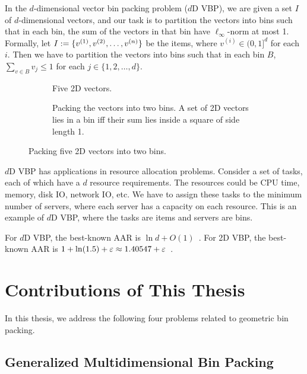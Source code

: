 In the $d$-dimensional vector bin packing problem ($d$D VBP),
we are given a set $I$ of $d$-dimensional vectors,
and our task is to partition the vectors into bins such that in each bin,
the sum of the vectors in that bin have $\ell_\infty$-norm at most 1.
Formally, let $I := \{v^{(1)}, v^{(2)}, \ldots, v^{(n)}\}$ be the items,
where $v^{(i)} \in (0, 1]^d$ for each $i$.
Then we have to partition the vectors into bins such that in each bin $B$,
$\sum_{v \in B} v_j \le 1$ for each $j \in \{1, 2, \ldots, d\}$.

\begin{figure}[htb]
\centering
\begin{subfigure}{0.45\textwidth}
    \centering
    
    \caption{Five 2D vectors.}
\end{subfigure}
\begin{subfigure}{0.54\textwidth}
    \centering
    
    \caption{Packing the vectors into two bins.
    A set of 2D vectors lies in a bin iff their sum
    lies inside a square of side length 1.}
\end{subfigure}
\caption{Packing five 2D vectors into two bins.}
\label{fig:2vbp-example}
\end{figure}

$d$D VBP has applications in resource allocation problems.
Consider a set of tasks, each of which have a $d$ resource requirements.
The resources could be CPU time, memory, disk IO, network IO, etc.
We have to assign these tasks to the minimum number of servers,
where each server has a capacity on each resource.
This is an example of $d$D VBP, where the tasks are items and servers are bins.

For $d$D VBP, the best-known AAR is $\ln d + O(1)$~\cite{rna,bansal2016improved}.
For 2D VBP, the best-known AAR is
$1 + \ln(1.5) + \varepsilon \approx 1.40547 + \varepsilon$~\cite{bansal2016improved}.

\section{Contributions of This Thesis}

In this thesis, we address the following four problems related to geometric bin packing.

\subsection{Generalized Multidimensional Bin Packing}

